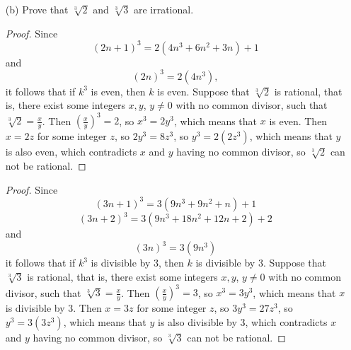 \documentclass{article}
\begin{document}
\begin{enumerate}
\begin{proof}
	\end{proof}
	This proof doesn't work for $\sqrt{4}$ because \[ (4n + 2)^2 = 4(4n^2 + 4n + 1) \] so $k^2$ being divisible by $4$ does not imply $k$ is divisible by $4$.
	\item[(b)] Prove that $\sqrt[3]{2}$ and $\sqrt[3]{3}$ are irrational.
	\begin{proof}
		Since \[(2n + 1)^3 = 2(4n^3 + 6n^2 + 3n) + 1\] and \[(2n)^3 = 2(4n^3),\] it follows that if $k^3$ is even, then $k$ is even. Suppose that $\sqrt[3]{2}$ is rational, that is, there exist some integers $x, y$, $y\ne 0$ with no common divisor, such that $\sqrt[3]{2} = \frac{x}{y}$. Then $(\frac{x}{y})^3 = 2$, so $x^3 = 2y^3$, which means that $x$ is even. Then $x = 2z$ for some integer $z$, so $2y^3 = 8z^3$, so $y^3 = 2(2z^3)$, which means that $y$ is also even, which contradicts $x$ and $y$ having no common divisor, so $\sqrt[3]{2}$ can not be rational.
	\end{proof}
	\begin{proof}
		Since \[(3n + 1)^3 = 3(9n^3 + 9n^2 + n) + 1\]\[(3n + 2)^3 = 3(9n^3 + 18n^2 + 12n + 2) + 2\] and \[(3n)^3 = 3(9n^3)\] it follows that if $k^3$ is divisible by $3$, then $k$ is divisible by $3$. Suppose that $\sqrt[3]{3}$ is rational, that is, there exist some integers $x, y$, $y \ne 0$ with no common divisor, such that $\sqrt[3]{3} = \frac{x}{y}$. Then $(\frac{x}{y})^3 = 3$, so $x^3 = 3y^3$, which means that $x$ is divisible by $3$. Then $x = 3z$ for some integer $z$, so $3y^3 = 27z^3$, so $y^3 = 3(3z^3)$, which means that $y$ is also divisible by $3$, which contradicts $x$ and $y$ having no common divisor, so $\sqrt[3]{3}$ can not be rational.
	\end{proof}
\end{enumerate}
\end{document}
